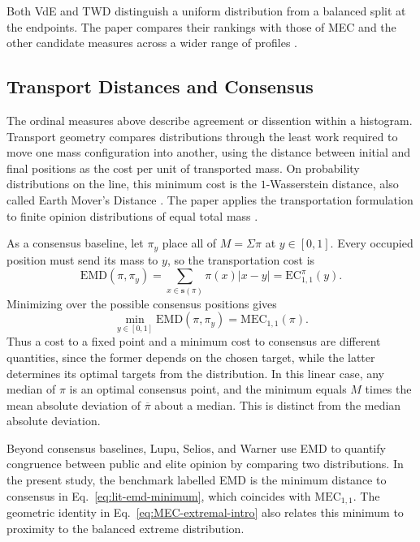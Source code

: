 \documentclass{article}
\theoremstyle{plain}
\theoremstyle{remark}
\begin{document}
Both VdE and TWD distinguish a uniform distribution from a balanced split at the endpoints. The paper compares their rankings with those of MEC and the other candidate measures across a wider range of profiles \citep{aranda2026mec}.

\subsection{Transport Distances and Consensus}\label{subsec:lit-transport}

The ordinal measures above describe agreement or dissention within a histogram. Transport geometry compares distributions through the least work required to move one mass configuration into another, using the distance between initial and final positions as the cost per unit of transported mass. On probability distributions on the line, this minimum cost is the $1$-Wasserstein distance, also called Earth Mover's Distance \citep{vallender1974calculation,geher2020isometric}. The paper applies the transportation formulation to finite opinion distributions of equal total mass \citep{aranda2026mec}.

As a consensus baseline, let $\pi_y$ place all of $M=\Sigma\pi$ at $y\in[0,1]$. Every occupied position must send its mass to $y$, so the transportation cost is
\begin{equation}\label{eq:lit-emd-consensus}
\mathrm{EMD}(\pi,\pi_y)
=\sum_{x\in\boldsymbol{s}(\pi)}\pi(x)|x-y|
=\mathrm{EC}_{1,1}^{\pi}(y).
\end{equation}
Minimizing over the possible consensus positions gives
\begin{equation}\label{eq:lit-emd-minimum}
\min_{y\in[0,1]}\mathrm{EMD}(\pi,\pi_y)
=\mathrm{MEC}_{1,1}(\pi).
\end{equation}
Thus a cost to a fixed point and a minimum cost to consensus are different quantities, since the former depends on the chosen target, while the latter determines its optimal targets from the distribution. In this linear case, any median of $\pi$ is an optimal consensus point, and the minimum equals $M$ times the mean absolute deviation of $\overline{\pi}$ about a median. This is distinct from the median absolute deviation.

Beyond consensus baselines, Lupu, Selios, and Warner \citep{lupu2017new} use EMD to quantify congruence between public and elite opinion by comparing two distributions. In the present study, the benchmark labelled EMD is the minimum distance to consensus in Eq.~\eqref{eq:lit-emd-minimum}, which coincides with $\mathrm{MEC}_{1,1}$. The geometric identity in Eq.~\eqref{eq:MEC-extremal-intro} also relates this minimum to proximity to the balanced extreme distribution.
\end{document}
